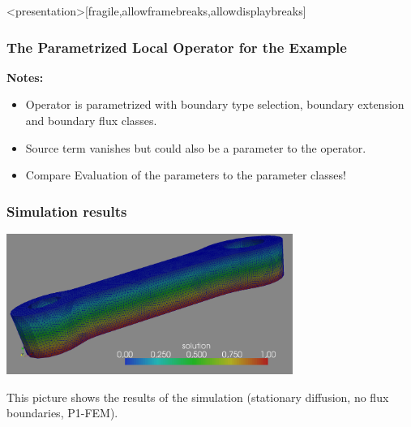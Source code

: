 \begin{frame}<presentation>[fragile,allowframebreaks,allowdisplaybreaks]
  \frametitle<presentation>{The Parametrized Local Operator for the Example}
  
  \textbf{Notes:}
  \begin{itemize}
    \item Operator is parametrized with boundary type selection,
      boundary extension and boundary flux classes.
    \item Source term vanishes but could also be a parameter to the operator.
    \item Compare Evaluation of the parameters to the parameter classes!
  \end{itemize}
\end{frame}

\begin{frame}
  \frametitle<presentation>{Simulation results}
  \begin{center}
    \includegraphics[width=0.7\textwidth]{./EPS/crank/crank_sol}
  \end{center}
  This picture shows the results of the simulation (stationary diffusion, no flux
  boundaries, P1-FEM).
\end{frame}

